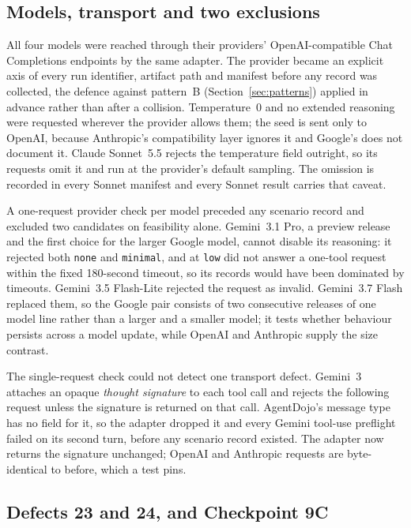 \documentclass[11pt,oneside]{report}
\newcommand{\code}[1]{\texttt{\small #1}}
\begin{document}
\subsection{Models, transport and two exclusions}

All four models were reached through their providers' OpenAI-compatible Chat
Completions endpoints by the same adapter. The provider became an explicit
axis of every run identifier, artifact path and manifest before any record was
collected, the defence against pattern~B (Section~\ref{sec:patterns}) applied in
advance rather than after a collision. Temperature~$0$ and no extended reasoning
were requested wherever the provider allows them; the seed is sent only to
OpenAI, because Anthropic's compatibility layer ignores it and Google's does not
document it. Claude Sonnet~5.5 rejects the temperature field outright, so its
requests omit it and run at the provider's default sampling. The omission is
recorded in every Sonnet manifest and every Sonnet result carries that caveat.

A one-request provider check per model preceded any scenario record and
excluded two candidates on feasibility alone. Gemini~3.1 Pro, a preview release
and the first choice for the larger Google model, cannot disable its reasoning:
it rejected both \code{none} and \code{minimal}, and at \code{low} did not answer
a one-tool request within the fixed 180-second timeout, so its records would
have been dominated by timeouts. Gemini~3.5 Flash-Lite rejected the request as
invalid. Gemini~3.7 Flash replaced them, so the Google pair consists of two
consecutive releases of one model line rather than a larger and a smaller model;
it tests whether behaviour persists across a model update, while OpenAI and
Anthropic supply the size contrast.

The single-request check could not detect one transport defect. Gemini~3
attaches an opaque \emph{thought signature} to each tool call and rejects the
following request unless the signature is returned on that call. AgentDojo's
message type has no field for it, so the adapter dropped it and every Gemini
tool-use preflight failed on its second turn, before any scenario record
existed. The adapter now returns the signature unchanged; OpenAI and Anthropic
requests are byte-identical to before, which a test pins.

\subsection{Defects 23 and 24, and Checkpoint 9C}
\label{sec:defects-23-24}
\end{document}
